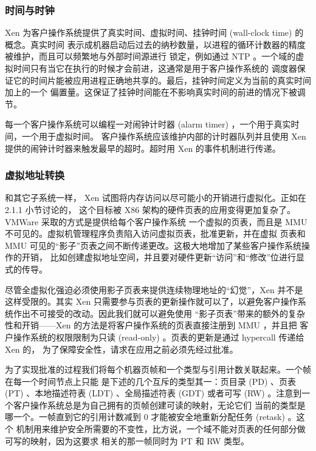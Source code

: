 \subsubsection{时间与时钟}

Xen 为客户操作系统提供了真实时间、虚拟时间、挂钟时间 (wall-clock time) 的概念。真实时间
表示成机器启动后过去的纳秒数量，以进程的循环计数器的精度被维护，而且可以频繁地与外部时间源进行
锁定，例如通过 NTP 。一个域的虚拟时间只有当它在执行的时候才会前进，这通常是用于客户操作系统的
调度器保证它的时间片能被应用进程正确地共享的。最后，挂钟时间定义为当前的真实时间加上的一个
偏置量。这保证了挂钟时间能在不影响真实时间的前进的情况下被调节。

每一个客户操作系统可以编程一对闹钟计时器 (alarm timer) ，一个用于真实时间，一个用于虚拟时间。
客户操作系统应该维护内部的计时器队列并且使用 Xen 提供的闹钟计时器来触发最早的超时。超时用
Xen 的事件机制进行传递。

\subsubsection{虚拟地址转换}

和其它子系统一样， Xen 试图将内存访问以尽可能小的开销进行虚拟化。正如在 2.1.1 小节讨论的，
这个目标被 X86 架构的硬件页表的应用变得更加复杂了。VMWare 采取的方式是提供给每个客户操作系统
一个虚拟的页表，而且是 MMU 不可见的。虚拟机管理程序负责陷入访问虚拟页表，批准更新，并在虚拟
页表和 MMU 可见的“影子”页表之间不断传递更改。这极大地增加了某些客户操作系统操作的开销，
比如创建虚拟地址空间，并且要对硬件更新“访问”和“修改”位进行显式的传导。

尽管全虚拟化强迫必须使用影子页表来提供连续物理地址的“幻觉”，Xen 并不是这样受限的。其实 Xen
只需要参与页表的更新操作就可以了，以避免客户操作系统作出不可接受的改动。因此我们就可以避免使用
“影子页表”带来的额外的复杂性和开销——Xen 的方法是将客户操作系统的页表直接注册到 MMU ，并且把
客户操作系统的权限限制为只读 (read-only) 。页表的更新是通过 hypercall 传递给 Xen 的，
为了保障安全性，请求在应用之前必须先经过批准。

为了实现批准的过程我们将每个机器页帧和一个类型与引用计数关联起来。一个帧在每一个时间节点上只能
是下述的几个互斥的类型其一：页目录 (PD) 、页表 (PT) 、本地描述符表 (LDT) 、全局描述符表
 (GDT) 或者可写 (RW) 。注意到一个客户操作系统总是为自己拥有的页帧创建可读的映射，无论它们
当前的类型是哪一个。一帧直到它的引用计数减到 0 才能被安全地重新分配任务 (retask) 。这个
机制用来维护安全所需要的不变性，比方说，一个域不能对页表的任何部分做可写的映射，因为这要求
相关的那一帧同时为 PT 和 RW 类型。

